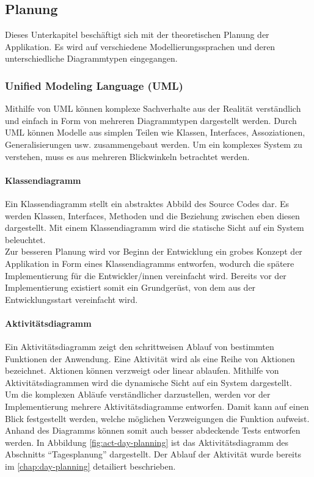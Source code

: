 \subsection{Planung}
Dieses Unterkapitel beschäftigt sich mit der theoretischen Planung der Applikation. Es wird auf verschiedene Modellierungssprachen und deren unterschiedliche Diagrammtypen eingegangen. 

\subsubsection{Unified Modeling Language (UML)}
Mithilfe von \acs{UML} können komplexe Sachverhalte aus der Realität verständlich und einfach in Form von mehreren Diagrammtypen dargestellt werden. Durch \acs{UML} können Modelle aus simplen Teilen wie Klassen, Interfaces, Assoziationen, Generalisierungen \ac{usw.} zusammengebaut werden. Um ein komplexes System zu verstehen, muss es aus mehreren Blickwinkeln betrachtet werden. \cite{booch:1999:uml}

\paragraph{Klassendiagramm}
Ein Klassendiagramm stellt ein abstraktes Abbild des Source Codes dar. Es werden Klassen, Interfaces, Methoden und die Beziehung zwischen eben diesen dargestellt. Mit einem Klassendiagramm wird die statische Sicht auf ein System beleuchtet. \cite{booch:1999:uml} \\
Zur besseren Planung wird vor Beginn der Entwicklung ein grobes Konzept der Applikation in Form eines Klassendiagramms entworfen, wodurch die spätere Implementierung für die Entwickler/innen vereinfacht wird. Bereits vor der Implementierung existiert somit ein Grundgerüst, von dem aus der Entwicklungsstart vereinfacht wird. 

\paragraph{Aktivitätsdiagramm}
Ein Aktivitätsdiagramm zeigt den schrittweisen Ablauf von bestimmten Funktionen der Anwendung. Eine Aktivität wird als eine Reihe von Aktionen bezeichnet. Aktionen können verzweigt oder linear ablaufen. Mithilfe von Aktivitätsdiagrammen wird die dynamische Sicht auf ein System dargestellt. \cite{booch:1999:uml} \\
Um die komplexen Abläufe verständlicher darzustellen, werden vor der Implementierung mehrere Aktivitätsdiagramme entworfen. Damit kann auf einen Blick festgestellt werden, welche möglichen Verzweigungen die Funktion aufweist. Anhand des Diagramms können somit auch besser abdeckende Tests entworfen werden. In Abbildung \ref{fig:act-day-planning} ist das Aktivitätsdiagramm des Abschnitts \enquote{Tagesplanung} dargestellt. Der Ablauf der Aktivität wurde bereits im \autoref{chap:day-planning} detailiert beschrieben.

